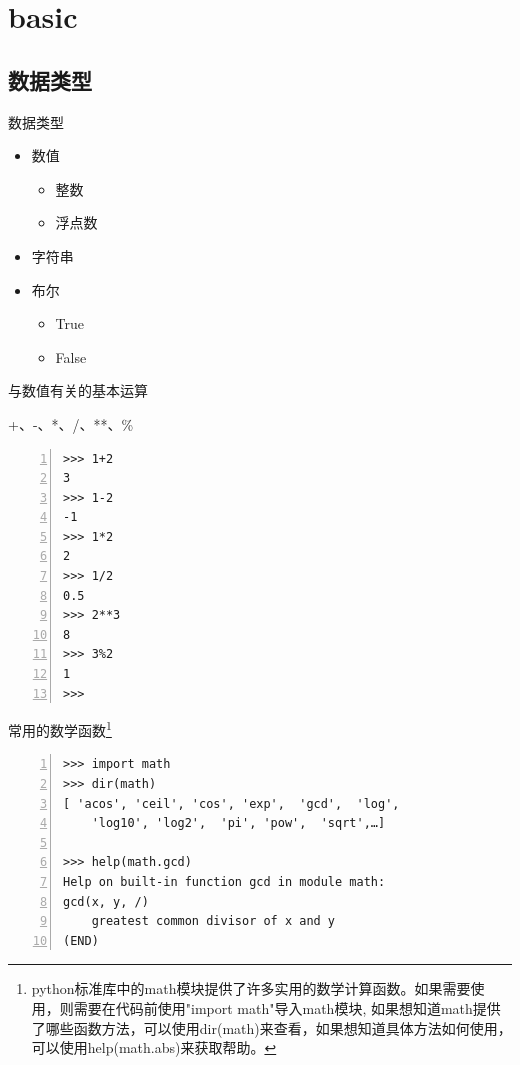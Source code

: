 \documentclass{beamer}
\begin{document}
\section{basic}
\begin{frame}
\end{frame}
\subsection{数据类型}
\begin{frame}{数据类型}
\begin{itemize}
\item
数值
\begin{itemize}
\item
整数
\item
浮点数
\end{itemize}
\item
字符串
\item
布尔
\begin{itemize}
\item
True
\item
False
\end{itemize}
\end{itemize}
\end{frame}
\begin{frame}[fragile]{与数值有关的基本运算}
\begin{block}{+、-、*、/、**、\%}
\begin{Verbatim}[numbers=left,frame=single,rulecolor=\color{red}]
>>> 1+2
3
>>> 1-2
-1
>>> 1*2
2
>>> 1/2
0.5
>>> 2**3
8
>>> 3%2
1
>>> 
\end{Verbatim}
\end{block}

\end{frame}
\begin{frame}[fragile]{常用的数学函数\footnote{python标准库中的math模块提供了许多实用的数学计算函数。如果需要使用，则需要在代码前使用"import math"导入math模块, 如果想知道math提供了哪些函数方法，可以使用dir(math)来查看，如果想知道具体方法如何使用，可以使用help(math.abs)来获取帮助。}}

\begin{block}{}
\begin{Verbatim}[numbers=left,frame=single,rulecolor=\color{red}]
>>> import math
>>> dir(math)
[ 'acos', 'ceil', 'cos', 'exp',  'gcd',  'log', 
    'log10', 'log2',  'pi', 'pow',  'sqrt',…]

>>> help(math.gcd)
Help on built-in function gcd in module math:
gcd(x, y, /)
    greatest common divisor of x and y
(END)
\end{Verbatim}
\end{block}
\end{frame}
\end{document}
